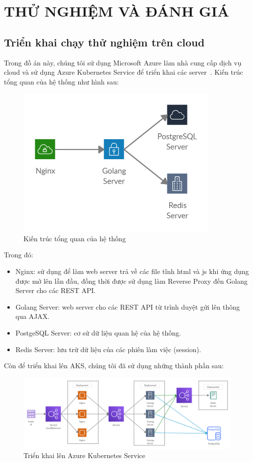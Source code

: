 \chapter{THỬ NGHIỆM VÀ ĐÁNH GIÁ}
\section{Triển khai chạy thử nghiệm trên cloud}
Trong đồ án này, chúng tôi sử dụng Microsoft Azure làm nhà cung cấp dịch vụ
cloud và sử dụng Azure Kubernetes Service
để triển khai các server~\cite{kubeazure}.
Kiến trúc tổng quan của hệ thống như hình sau:
\begin{figure}[H]
\centering
\includegraphics[width=10cm]{images/architecture.png}
\caption{Kiến trúc tổng quan của hệ thống}
\end{figure}
Trong đó:
\begin{itemize}[topsep=0ex]
\item Nginx: sử dụng để làm web server trả về các file tĩnh html và js khi
ứng dụng được mở lên lần đầu, đồng thời được sử dụng làm Reverse Proxy đến
Golang Server cho các REST API.

\item Golang Server: web server cho các REST API từ trình duyệt gửi lên
thông qua AJAX.

\item PostgeSQL Server: cơ sử dữ liệu quan hệ của hệ thống.

\item Redis Server: lưu trữ dữ liệu của các phiên làm việc (session).
\end{itemize}

Còn để triển khai lên AKS, chúng tôi đã sử dụng những thành phần sau:
\begin{figure}[H]
\centering
\includegraphics[width=\textwidth]{images/deploy.png}
\caption{Triển khai lên Azure Kubernetes Service}
\end{figure}

